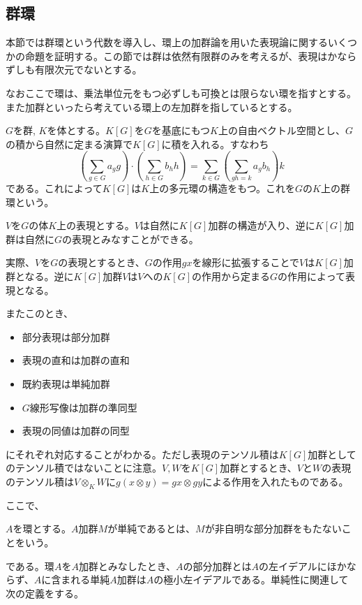 \documentclass{ltjsreport}
\begin{document}
\subsection{群環}

本節では群環という代数を導入し、環上の加群論を用いた表現論に関するいくつかの命題を証明する。この節では群は依然有限群のみを考えるが、表現はかならずしも有限次元でないとする。

なおここで環は、乗法単位元をもつ必ずしも可換とは限らない環を指すとする。また加群といったら考えている環上の左加群を指しているとする。

\begin{defin}
  $G$を群, $K$を体とする。$K[G]$を$G$を基底にもつ$K$上の自由ベクトル空間とし、$G$の積から自然に定まる演算で$K[G]$に積を入れる。すなわち
  \[
  \left(\sum_{g\in G}a_gg\right)\cdot\left(\sum_{h\in G}b_hh\right)  =\sum_{k \in G}\left(\sum_{gh=k}a_gb_h\right)k
  \]
  である。これによって$K[G]$は$K$上の多元環の構造をもつ。これを$G$の$K$上の群環という。
\end{defin}

$V$を$G$の体$K$上の表現とする。$V$は自然に$K[G]$加群の構造が入り、逆に$K[G]$加群は自然に$G$の表現とみなすことができる。

実際、$V$を$G$の表現とするとき、$G$の作用$gx$を線形に拡張することで$V$は$K[G]$加群となる。逆に$K[G]$加群$V$は$V$への$K[G]$の作用から定まる$G$の作用によって表現となる。

またこのとき、
\begin{itemize}
  \item 部分表現は部分加群
  \item 表現の直和は加群の直和
  \item 既約表現は単純加群
  \item $G$線形写像は加群の準同型
  \item 表現の同値は加群の同型
\end{itemize}
にそれぞれ対応することがわかる。ただし表現のテンソル積は$K[G]$加群としてのテンソル積ではないことに注意。$V,W$を$K[G]$加群とするとき、$V$と$W$の表現のテンソル積は$V\otimes_{K}W$に$g(x\otimes y)=gx\otimes gy$による作用を入れたものである。

ここで、

\begin{defin}
  $A$を環とする。$A$加群$M$が単純であるとは、$M$が非自明な部分加群をもたないことをいう。
\end{defin}

である。環$A$を$A$加群とみなしたとき、$A$の部分加群とは$A$の左イデアルにほかならず、$A$に含まれる単純$A$加群は$A$の極小左イデアルである。単純性に関連して次の定義をする。
\end{document}
